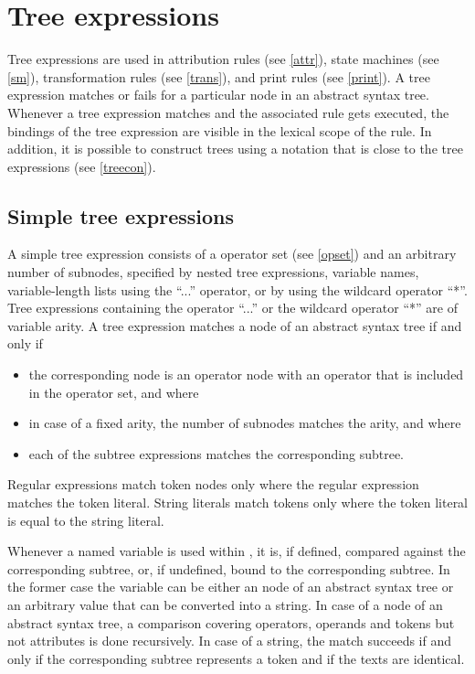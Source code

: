 \chapter{Tree expressions}\label{treeexpr}

Tree expressions are used in attribution rules (see \ref{attr}), state
machines (see \ref{sm}), transformation rules (see \ref{trans}), and
print rules (see \ref{print}). A tree expression matches or fails for a
particular node in an abstract syntax tree. Whenever a tree expression
matches and the associated rule gets executed, the bindings of the tree
expression are visible in the lexical scope of the rule. In addition,
it is possible to construct trees using a notation that is close
to the tree expressions (see \ref{treecon}).

\section{Simple tree expressions}

A simple tree expression consists of a operator set (see \ref{opset}) and an arbitrary number of subnodes, specified
by nested tree expressions, variable names, variable-length lists
using the ``...'' operator, or by using the wildcard operator
``*''. Tree expressions containing the operator ``...'' or the wildcard
operator ``*'' are of variable arity.  A tree
expression matches a node of an abstract syntax tree if and only if
\begin{itemize}
   \item the corresponding node is an operator node
      with an operator that is included in the operator set, and where
   \item in case of a fixed arity, the number of subnodes matches
      the arity, and where
   \item each of the subtree expressions matches the corresponding subtree.
\end{itemize}

Regular expressions match token nodes only
where the regular expression matches the token literal. String literals
match tokens only where the token literal is equal to the string literal.

Whenever a named variable is used within , it
is, if defined, compared against the corresponding subtree, or, if
undefined, bound to the corresponding subtree. In the former case the
variable can be either an node of an abstract syntax tree or an arbitrary value
that can be converted into a string. In case of a node of an abstract
syntax tree, a comparison covering operators, operands and tokens but
not attributes is done recursively. In case of a string, the match
succeeds if and only if the corresponding subtree represents a token
and if the texts are identical.

